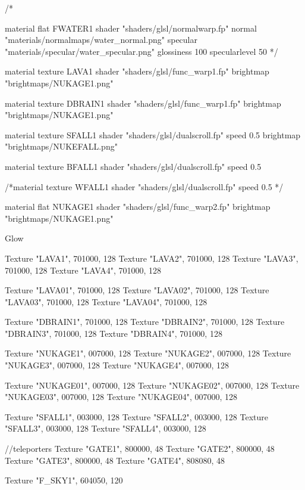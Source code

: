 /*

material flat FWATER1 {
	shader "shaders/glsl/normalwarp.fp"
	normal "materials/normalmaps/water_normal.png"
	specular "materials/specular/water_specular.png"
	glossiness 100
	specularlevel 50
}*/

material texture LAVA1 {
	shader "shaders/glsl/func_warp1.fp"
	brightmap "brightmaps/NUKAGE1.png"
}

material texture DBRAIN1 {
	shader "shaders/glsl/func_warp1.fp"
	brightmap "brightmaps/NUKAGE1.png"
}

material texture SFALL1 {
	shader "shaders/glsl/dualscroll.fp"
	speed 0.5
	brightmap "brightmaps/NUKEFALL.png"
}

material texture BFALL1 {
	shader "shaders/glsl/dualscroll.fp"
	speed 0.5
}

/*material texture WFALL1 {
	shader "shaders/glsl/dualscroll.fp"
	speed 0.5
}*/


material flat NUKAGE1 {
	shader "shaders/glsl/func_warp2.fp"
	brightmap "brightmaps/NUKAGE1.png"
}

Glow {
	Texture "LAVA1", 701000, 128
	Texture "LAVA2", 701000, 128
	Texture "LAVA3", 701000, 128
	Texture "LAVA4", 701000, 128
	
	Texture "LAVA01", 701000, 128
	Texture "LAVA02", 701000, 128
	Texture "LAVA03", 701000, 128
	Texture "LAVA04", 701000, 128
	
	Texture "DBRAIN1", 701000, 128
	Texture "DBRAIN2", 701000, 128
	Texture "DBRAIN3", 701000, 128
	Texture "DBRAIN4", 701000, 128
	
	Texture "NUKAGE1", 007000, 128
	Texture "NUKAGE2", 007000, 128
	Texture "NUKAGE3", 007000, 128
	Texture "NUKAGE4", 007000, 128
	
	Texture "NUKAGE01", 007000, 128
	Texture "NUKAGE02", 007000, 128
	Texture "NUKAGE03", 007000, 128
	Texture "NUKAGE04", 007000, 128
	
	Texture "SFALL1", 003000, 128
	Texture "SFALL2", 003000, 128
	Texture "SFALL3", 003000, 128
	Texture "SFALL4", 003000, 128
	
	//teleporters
	Texture "GATE1", 800000, 48
	Texture "GATE2", 800000, 48
	Texture "GATE3", 800000, 48
	Texture "GATE4", 808080, 48
	
	Texture "F_SKY1", 604050, 120
}
